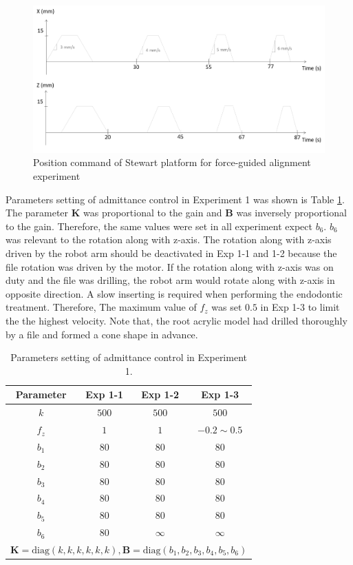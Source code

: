 \begin{figure}[htbp]
\begin{center}
\includegraphics[width=1\linewidth]{Images/position command.png}
\caption{Position command of Stewart platform for force-guided alignment experiment}
\label{fig: position command}
\end{center}
\end{figure}	
\par
Parameters setting of admittance control in Experiment 1 was shown is Table \ref{tab: para_adm_exp1}. The parameter $\mathbf{K}$ was proportional to the gain and $\mathbf{B}$ was inversely proportional to the gain. Therefore, the same values were set in all experiment expect $b_6$. $b_6$ was relevant to the rotation along with z-axis. The rotation along with z-axis driven by the robot arm should be deactivated in Exp 1-1 and 1-2 because the file rotation was driven by the motor. If the rotation along with z-axis was on duty and the file was drilling, the robot arm would rotate along with z-axis in opposite direction. A slow inserting is required when performing the endodontic treatment. Therefore, The maximum value of $f_z$ was set $0.5$ in Exp 1-3 to limit the the highest velocity. Note that, the root acrylic model had drilled thoroughly by a file and formed a cone shape in advance.
\par
\begin{table}[htbp]
\centering
\tabcolsep=25pt
\caption{Parameters setting of admittance control in Experiment 1.}
\label{tab: para_adm_exp1}
\begin{tabular}{cccc} 
\hline \hline
Parameter	&Exp 1-1		&Exp 1-2		&Exp 1-3	\\
\hline
$k$			&$500$		&$500$		&$500$				\\
$f_z$		&$1$		&$1$		&$-0.2 \sim 0.5$	\\
$b_1$		&$80$		&$80$		&$80$				\\
$b_2$		&$80$		&$80$		&$80$				\\
$b_3$		&$80$		&$80$		&$80$				\\
$b_4$		&$80$		&$80$		&$80$				\\
$b_5$		&$80$		&$80$		&$80$				\\
$b_6$		&$80$		&$\infty$	&$\infty$			\\
\hline
\multicolumn{4}{c}{ $\mathbf{K} = \text{diag}(k,k,k,k,k,k), \mathbf{B} = \text{diag}(b_1,b_2,b_3,b_4,b_5,b_6)$} \\
\hline\hline	
\end{tabular}
\end{table}
